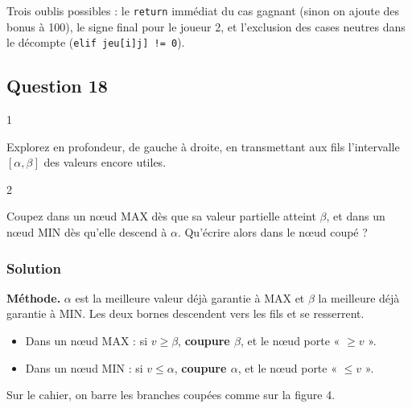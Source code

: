 \documentclass[11pt,a4paper]{article}
\providecommand{\tightlist}{\setlength{\itemsep}{0pt}\setlength{\parskip}{0pt}}
\begin{document}
\begin{piege}

Trois oublis possibles : le \texttt{return} immédiat du cas gagnant (sinon on ajoute des bonus à 100), le signe final pour le joueur 2, et l'exclusion des cases neutres dans le décompte (\texttt{elif\ jeu{[}i{]}\allowbreak{}{[}j{]}\allowbreak{}\ !=\allowbreak{}\ 0}).

\end{piege}

\hypertarget{question-18}{%
\subsection{Question 18}\label{question-18}}

\begin{indication}{1}

Explorez en profondeur, de gauche à droite, en transmettant aux fils l'intervalle \([\alpha,\beta]\) des valeurs encore utiles.

\end{indication}

\begin{indication}{2}

Coupez dans un nœud MAX dès que sa valeur partielle atteint \(\beta\), et dans un nœud MIN dès qu'elle descend à \(\alpha\). Qu'écrire alors dans le nœud coupé ?

\end{indication}

\hypertarget{solution-17}{%
\subsubsection{Solution}\label{solution-17}}

\textbf{Méthode.} \(\alpha\) est la meilleure valeur déjà garantie à MAX et \(\beta\) la meilleure déjà garantie à MIN. Les deux bornes descendent vers les fils et se resserrent.

\begin{itemize}
\tightlist
\item
  Dans un nœud MAX : si \(v\ge\beta\), \textbf{coupure \(\beta\)}, et le nœud porte « \(\ge v\) ».
\item
  Dans un nœud MIN : si \(v\le\alpha\), \textbf{coupure \(\alpha\)}, et le nœud porte « \(\le v\) ».
\end{itemize}

Sur le cahier, on barre les branches coupées comme sur la figure 4.
\end{document}
